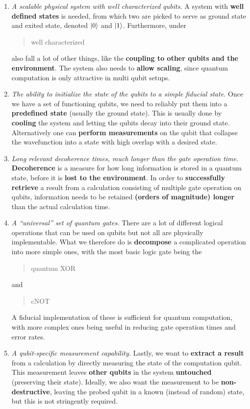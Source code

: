 \documentclass{alex_summary}
\begin{document}
\begin{enumerate}[leftmargin=*]
	\item \textit{A scalable physical system with well characterized qubits.} A system with \textbf{well defined states} is needed, from which two are picked to serve as ground state and exited state, denoted \( \ket{0} \) and \( \ket{1} \). Furthermore, under \blockquote{well characterized} also fall a lot of other things, like the \textbf{coupling to other qubits and the environment}. The system also needs to \textbf{allow scaling}, since quantum computation is only attractive in multi qubit setups.
	\item \textit{The ability to initialize the state of the qubits to a simple fiducial state.} Once we have a set of functioning qubits, we need to reliably put them into a \textbf{predefined state} (usually the ground state). This is usually done by \textbf{cooling} the system and letting the qubits decay into their ground state. Alternatively one can \textbf{perform measurements} on the qubit that collapse the wavefunction into a state with high overlap with a desired state.
	\item \textit{Long relevant decoherence times, much longer than the gate operation time.} \textbf{Decoherence} is a measure for how long information is stored in a quantum state, before it is \textbf{lost to the environment}. In order to \textbf{successfully retrieve} a result from a calculation consisting of multiple gate operation on qubits, information needs to be retained \textbf{(orders of magnitude) longer} than the actual calculation time. 
	\item \textit{A “universal” set of quantum gates.} There are a lot of different logical operations that can be used on qubits but not all are physically implementable. What we therefore do is \textbf{decompose} a complicated operation into more simple ones, with the most basic logic gate being the \blockquote{quantum XOR} and \blockquote{cNOT}. A fiducial implementation of these is sufficient for quantum computation, with more complex ones being useful in reducing gate operation times and error rates.
	\item \textit{A qubit-specific measurement capability.} Lastly, we want to \textbf{extract a result} from a calculation by directly measuring the state of the computation qubit. This measurement leaves \textbf{other qubits} in the system \textbf{untouched} (preserving their state). Ideally, we also want the measurement to be \textbf{non-destructive}, leaving the probed qubit in a known (instead of random) state, but this is not stringently required.

\end{enumerate}
\end{document}
